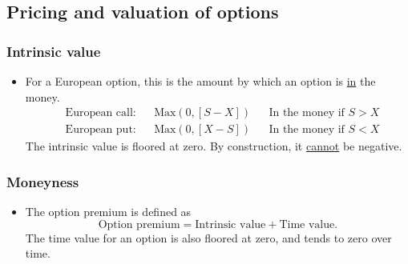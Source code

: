 \documentclass[../notes_compiled.tex]{subfiles}
\begin{document}
\subsection{Pricing and valuation of options}
\subsubsection*{Intrinsic value}
\begin{itemize}
\item For a European option, this is the amount by which an option is \underline{in} the money.
\begin{align*}
&& &\text{European call:} & &\text{Max}\left(0, [S-X]\right) & &\text{In the money if }S>X && \\
&& &\text{European put:} & &\text{Max}\left(0, [X-S]\right) & &\text{In the money if }S<X &&
\end{align*}
The intrinsic value is floored at zero. By construction, it \underline{cannot} be negative.
\end{itemize}

\subsubsection*{Moneyness}
\begin{itemize}
\item The option premium is defined as
\begin{equation}
\text{Option premium} = \text{Intrinsic value} + \text{Time value}.
\end{equation}
The time value for an option is also floored at zero, and tends to zero over time.
\end{itemize}
\end{document}
